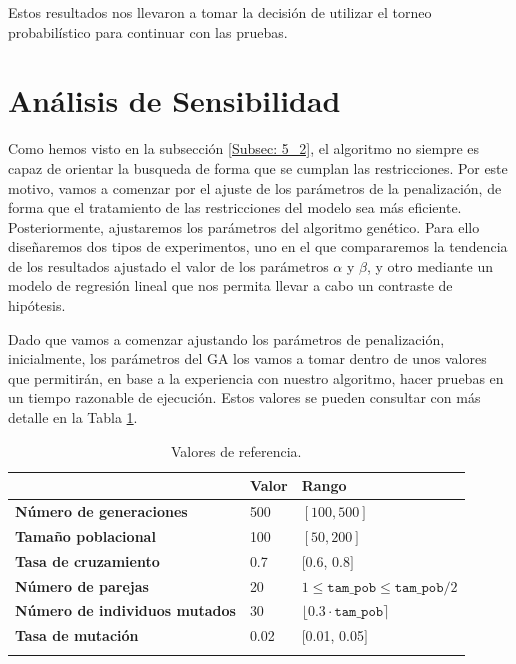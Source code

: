 \documentclass[12pt,a4paper]{book}
\begin{document}
Estos resultados nos llevaron a tomar la decisión de utilizar el torneo probabilístico para continuar con las pruebas. 

\section{Análisis de Sensibilidad} \label{Subsec: 5_4}
Como hemos visto en la subsección \ref{Subsec: 5_2}, el algoritmo no siempre es capaz de orientar la busqueda de forma que se cumplan las restricciones. Por este motivo, vamos a comenzar por el ajuste de los parámetros de la penalización, de forma que el tratamiento de las restricciones del modelo sea más eficiente. Posteriormente, ajustaremos los parámetros del algoritmo genético. Para ello diseñaremos dos tipos de experimentos, uno en el que compararemos la tendencia de los resultados ajustado el valor de los parámetros $\alpha$ y $\beta$, y otro mediante un modelo de regresión lineal que nos permita llevar a cabo un contraste de hipótesis.  

Dado que vamos a comenzar ajustando los parámetros de penalización, inicialmente, los parámetros del GA los vamos a tomar dentro de unos valores que permitirán, en base a la experiencia con nuestro algoritmo, hacer pruebas en un tiempo razonable de ejecución. Estos valores se pueden consultar con más detalle en la Tabla \ref{tab: par_AG}.

\begin{longtable}[hc]{lll}
\hline
\textbf{}                             & \textbf{Valor} & \textbf{Rango}                              \\ \hline
\endfirsthead
%
\endhead
%
\hline
\endfoot
%
\endlastfoot
%
\textbf{Número de generaciones}       & 500            & $[100, 500]$                                        \\
\textbf{Tamaño poblacional}           & 100            & $[50, 200]$                                         \\
\textbf{Tasa de cruzamiento}          & 0.7            & $[$0.6, 0.8$]$                                        \\
\textbf{Número de parejas}            & 20             & $1 \leq \texttt{tam\_pob} \leq \texttt{tam\_pob}/2$ \\
\textbf{Número de individuos mutados} & 30             & $\lfloor 0.3 \cdot \texttt{tam\_pob} \rceil$        \\
\textbf{Tasa de mutación}             & 0.02           & $[$0.01, 0.05$]$                                      \\ \hline
\caption{Valores de referencia.}
\label{tab: par_AG}\\
\end{longtable} 
\end{document}
